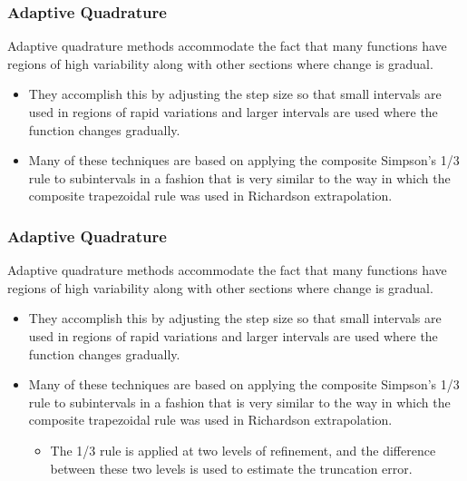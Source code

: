 \documentclass{if-beamer}
\begin{document}
\begin{frame}[t]
	\frametitle{Adaptive Quadrature}
	Adaptive quadrature methods accommodate the fact that many functions have regions of
	high variability along with other sections where change is gradual.
	\begin{itemize}
		\item They accomplish this
		by adjusting the step size so that small intervals are used in regions of rapid variations and
		larger intervals are used where the function changes gradually. \vspace{5pt}
		\item Many of these techniques
		are based on applying the composite Simpson’s 1/3 rule to subintervals in a fashion that
		is very similar to the way in which the composite trapezoidal rule was used in Richardson
		extrapolation. \vspace{5pt}
	\end{itemize}
\end{frame}

\begin{frame}[t]
	\frametitle{Adaptive Quadrature}
	Adaptive quadrature methods accommodate the fact that many functions have regions of
	high variability along with other sections where change is gradual.
	\begin{itemize}
		\item They accomplish this
		by adjusting the step size so that small intervals are used in regions of rapid variations and
		larger intervals are used where the function changes gradually. \vspace{5pt}
		\item Many of these techniques
		are based on applying the composite Simpson’s 1/3 rule to subintervals in a fashion that
		is very similar to the way in which the composite trapezoidal rule was used in Richardson
		extrapolation. \vspace{5pt}
		\begin{itemize}
			\item The 1/3 rule is applied at two levels of refinement, and the difference
			between these two levels is used to estimate the truncation error. \vspace{3pt}
		\end{itemize}
	\end{itemize}
\end{frame}
\end{document}
